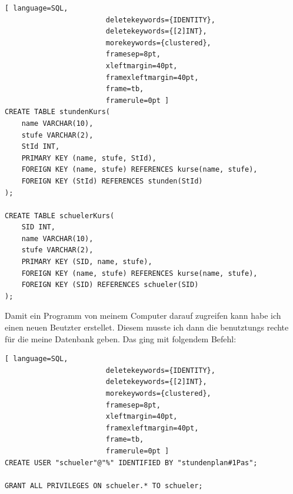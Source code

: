 \documentclass[a4paper, 12pt]{article}
\theoremstyle{plain}
\theoremstyle{definition}
\begin{document}
		\begin{lstlisting}[ language=SQL,
	                    deletekeywords={IDENTITY},
	                    deletekeywords={[2]INT},
	                    morekeywords={clustered},
	                    framesep=8pt,
	                    xleftmargin=40pt,
	                    framexleftmargin=40pt,
	                    frame=tb,
	                    framerule=0pt ]
CREATE TABLE stundenKurs(
	name VARCHAR(10), 
	stufe VARCHAR(2), 
	StId INT, 
	PRIMARY KEY (name, stufe, StId),
	FOREIGN KEY (name, stufe) REFERENCES kurse(name, stufe), 
	FOREIGN KEY (StId) REFERENCES stunden(StId)
);

CREATE TABLE schuelerKurs(
	SID INT, 
	name VARCHAR(10), 
	stufe VARCHAR(2),
	PRIMARY KEY (SID, name, stufe),
	FOREIGN KEY (name, stufe) REFERENCES kurse(name, stufe), 
	FOREIGN KEY (SID) REFERENCES schueler(SID)
);
	\end{lstlisting}
Damit ein Programm von meinem Computer darauf zugreifen kann habe ich einen neuen Beutzter erstellet. Diesem musste ich dann die benutztungs rechte für die meine Datenbank geben. Das ging mit folgendem Befehl:
	
	\begin{lstlisting}[ language=SQL,
	                    deletekeywords={IDENTITY},
	                    deletekeywords={[2]INT},
	                    morekeywords={clustered},
	                    framesep=8pt,
	                    xleftmargin=40pt,
	                    framexleftmargin=40pt,
	                    frame=tb,
	                    framerule=0pt ]	
CREATE USER "schueler"@"%" IDENTIFIED BY "stundenplan#1Pas";

GRANT ALL PRIVILEGES ON schueler.* TO schueler;
	\end{lstlisting}	
	\newpage
	\printbibliography
	
	\appendix
	
\end{document}
